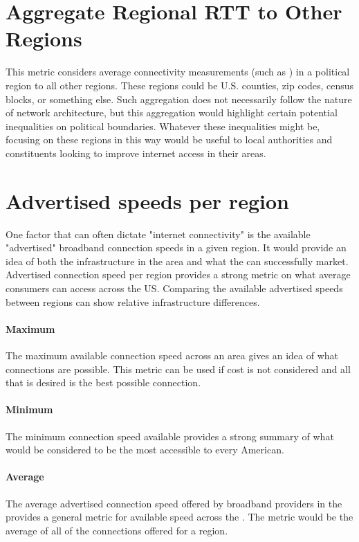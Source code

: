 \section{Aggregate Regional RTT to Other Regions}

This metric considers average connectivity measurements (such as \rtt) in a political region to all other regions. These regions could be U.S. counties, zip codes, census blocks, or something else. Such aggregation does not necessarily follow the nature of network architecture, but this aggregation would highlight certain potential inequalities on political boundaries. Whatever these inequalities might be, focusing on these regions in this way would be useful to local authorities and constituents looking to improve internet access in their areas.

\section{Advertised speeds per region}
One factor that can often dictate "internet connectivity" is the available "advertised" broadband connection speeds in a given region. It would provide an idea of both the infrastructure in the area and what the \isp can successfully market. Advertised connection speed per region provides a strong metric on what average consumers can access across the US. Comparing the available advertised speeds between regions can show relative infrastructure differences.

\paragraph{Maximum}
The maximum available connection speed across an area gives an idea of what connections are possible. This metric can be used if cost is not considered and all that is desired is the best possible connection.

\paragraph{Minimum}
The minimum connection speed available provides a strong summary of what would be considered to be the most accessible to every American.

\paragraph{Average}
The average advertised connection speed offered by broadband providers in the \us provides a general metric for available speed across the \us. The metric would be the average of all of the connections offered for a region.

